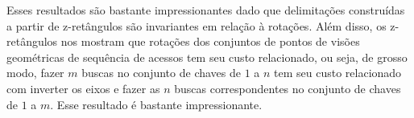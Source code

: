 Esses resultados são bastante impressionantes dado que delimitações construídas a partir de z-retângulos são invariantes em relação à rotações. Além disso, os z-retângulos nos mostram que rotações dos conjuntos de pontos de visões geométricas de sequência de acessos tem seu custo relacionado, ou seja, de grosso modo, fazer $m$ buscas no conjunto de chaves de $1$ a $n$ tem seu custo relacionado com inverter os eixos e fazer as $n$ buscas correspondentes no conjunto de chaves de $1$ a $m$. Esse resultado é bastante impressionante. 



